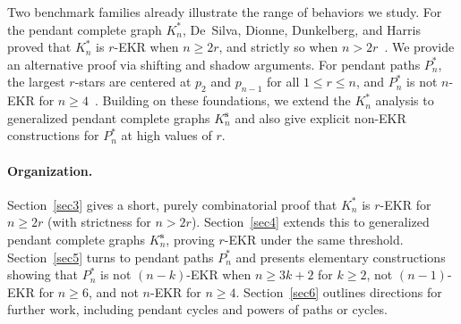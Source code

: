 \documentclass{article}
\theoremstyle{definition}
\newcommand{\s}{\mathbf{s}}
\newcommand{\1}{\mathbf{1}}
\begin{document}
\noindent Two benchmark families already illustrate the range of behaviors we study. For the pendant complete graph $K_n^*$, De~Silva, Dionne, Dunkelberg, and Harris proved that $K_n^*$ is $r$-EKR when $n\ge 2r$, and strictly so when $n>2r$~\cite[Theorem ~4]{DeSilvaDDH2023}. We provide an alternative proof via shifting and shadow arguments. For pendant paths $P_n^*$, the largest $r$-stars are centered at $p_2$ and $p_{n-1}$ for all $1\le r\le n$, and $P_n^*$ is not $n$-EKR for $n\ge 4$~\cite[Theorem 5 and Lemma 9]{DeSilvaDDH2023}. Building on these foundations, we extend the $K_n^*$ analysis to generalized pendant complete graphs $K_n^{\s}$ and also give explicit non-EKR constructions for $P_n^*$ at high values of $r$. 

\paragraph{Organization.}
Section~\ref{sec3} gives a short, purely combinatorial proof that $K_n^*$ is $r$-EKR for $n\ge 2r$ (with strictness for $n>2r$). Section~\ref{sec4} extends this to generalized pendant complete graphs $K_n^{\s}$, proving $r$-EKR under the same threshold. Section~\ref{sec5} turns to pendant paths $P_n^*$ and presents elementary constructions showing that $P_n^{*}$ is not $(n-k)$-EKR when $n \ge 3k+2$ for $k\ge 2$, not $(n-1)$-EKR for $n\ge 6$, and not $n$-EKR for $n\ge 4$. Section~\ref{sec6} outlines directions for further work, including pendant cycles and powers of paths or cycles.
\end{document}
